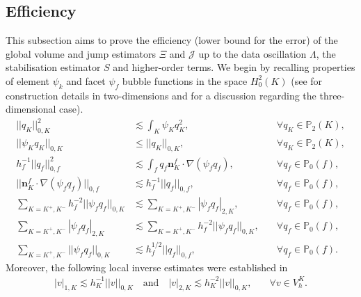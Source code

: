 \documentclass[final,reqno]{elsarticle}
\begin{document}
\subsection{Efficiency}\label{Efficiency}
This subsection aims to prove the efficiency (lower bound for the error) of the global volume and jump estimators $\Xi$ and $\mathcal{J}$ up to the data oscillation $\Lambda$, the stabilisation estimator $S$ and higher-order terms. We begin by recalling properties of element $\psi_k$ and facet $\psi_f$ bubble functions in the space $H^2_0(K)$ (see \cite[Section~3.7]{verfurth1996review} for construction details in two-dimensions and \cite[Remark 6]{dassi2025posteriorierrorestimatesc1} for a discussion regarding the three-dimensional case).
\begin{subequations}
\begin{align}
||q_K||_{0,K}^2&\lesssim \int_K \psi_K q_K^2, &\quad \forall q_K\in \mathbb{P}_2(K),\label{bubb1}\\
||\psi_Kq_K||_{0,K} &\leq ||q_K||_{0,K}, &\quad \forall q_K\in \mathbb{P}_2(K),\label{bubb2}\\
h_f^{-1}||q_f||_{0,f}^2&\lesssim \int_f q_f \mathbf{n}^f_{K} \cdot \nabla(\psi_f q_f), &\quad \forall q_f\in \mathbb{P}_0(f),\label{bubb1Edge}\\
%
||\mathbf{n}^f_{K} \cdot \nabla(\psi_f q_f)||_{0,f} &\lesssim h^{-1}_f||q_f||_{0,f}, &\quad \forall q_f\in \mathbb{P}_0(f),\label{bubb2Edge}\\
\sum_{K=K^+,K^-} h_f^{-2}||\psi_f q_f||_{0,K}&\lesssim \sum_{K=K^+,K^-} |\psi_f q_f|_{2,K}, &\quad \forall q_f\in \mathbb{P}_0(f),\label{bubb3Edge} \\
\sum_{K=K^+,K^-} |\psi_f q_f|_{2,K}&\lesssim \sum_{K=K^+,K^-} h_f^{-2}||\psi_f q_f||_{0,K}, &\quad \forall q_f\in \mathbb{P}_0(f),\label{bubb3_5Edge} \\
\sum_{K=K^+,K^-} ||\psi_f q_f||_{0,K}&\lesssim h_f^{1/2}||q_f||_{0,f}, &\quad\forall q_f\in \mathbb{P}_0(f).\label{bubb4Edge}
\end{align}
\end{subequations}
Moreover, the following  local inverse estimates were  established in \cite{zhao2023interior} 
\begin{align}
 | v|_{1,K}\lesssim h_K^{-1}||v||_{0,K} 
\quad
\mbox{and}
\quad 
 | v|_{2,K}\lesssim h_K^{-2}||v||_{0,K},
 &\quad \forall v\in  V_h^K .\label{bubb3}
\end{align}
\end{document}
